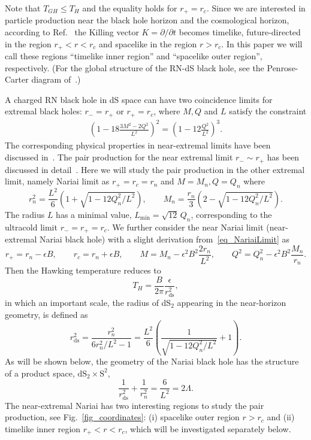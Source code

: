 \documentclass[aps,nofootinbib,superscriptaddress
]{revtex4}
\begin{document}
Note that $T_{GH} \leq T_H$ and the equality holds for $r_+ = r_c$. Since we are interested in particle production near the black hole horizon and the cosmological horizon, according to Ref.~\cite{Gibbons:1977mu} the Killing vector $K = \partial/\partial t$ becomes timelike, future-directed in the region $r_+ < r < r_c$ and spacelike in the region $r > r_c$. In this paper we will call these regions ``timelike inner region'' and ``spacelike outer region'', respectively. (For the global structure of the RN-dS black hole, see the Penrose-Carter diagram of~\cite{Gibbons:1977mu}.)


A charged RN black hole in dS space can have two coincidence limits for extremal black holes: $r_- = r_+$ or $r_+ = r_c$, where $M, Q$ and $L$ satisfy the constraint
\begin{eqnarray}
\left( 1 - 18 \frac{3 M^2 - 2 Q^2}{L^2} \right)^2 = \left( 1 - 12 \frac{Q^2}{L^2} \right)^3.
\end{eqnarray}
The corresponding physical properties in near-extremal limits have been discussed in~\cite{Castro:2022cuo}.
The pair production for the near extremal limit $r_- \sim r_+$ has been discussed in detail~\cite{Chen:2020mqs}. Here we will study the pair production in the other extremal limit, namely Nariai limit as $r_+ = r_c = r_n$ and $M = M_n, Q = Q_n$ where
\begin{equation} \label{eq_NariaiLimit}
r_n^2 = \frac{L^2}6 \left( 1 + \sqrt{1 - 12 Q_n^2/L^2} \right), \qquad M_n = \frac{r_n}3 \left( 2 - \sqrt{1 - 12 Q_n^2/L^2} \right).
\end{equation}
The radius $L$ has a minimal value, $L_\mathrm{min} = \sqrt{12} \, Q_n$, corresponding to the ultracold limit $r_- = r_+ = r_c$. We further consider the near Nariai limit (near-extremal Nariai black hole) with a slight derivation from~\eqref{eq_NariaiLimit} as
\begin{equation}
r_+ = r_n - \epsilon B, \qquad r_c = r_n + \epsilon B, \qquad M = M_n - \epsilon^2 B^2 \frac{2 r_n}{L^2}, \qquad Q^2 = Q_n^2 - \epsilon^2 B^2 \frac{M_n}{r_n}.
\end{equation}
Then the Hawking temperature reduces to
\begin{equation}
T_H = \frac{B}{2 \pi} \frac{\epsilon}{r_\mathrm{ds}^2},
\end{equation}
in which an important scale, the radius of dS$_2$ appearing in the near-horizon geometry, is defined as
\begin{equation} \label{eq_rds}
r_\mathrm{ds}^2 = \frac{r_n^2}{6 r_n^2/L^2 - 1} = \frac{L^2}{6} \left( \frac{1}{\sqrt{1 - 12 Q_n^2/L^2}} + 1 \right).
\end{equation}
As will be shown below, the geometry of the Nariai black hole has the structure of a product space, $\mathrm{dS}_2 \times \mathrm{S}^2$,~\cite{Ortaggio:2002bp}
\begin{equation}
\frac{1}{r_\mathrm{ds}^2} + \frac{1}{r_n^2} = \frac{6}{L^2} = 2 \Lambda.
\end{equation}
The near-extremal Nariai has two interesting regions to study the pair production, see Fig.~\ref{fig_coordinates}: (i) spacelike outer region $r > r_c$ and (ii) timelike inner region $r_+ < r < r_c$, which will be investigated separately below.
\end{document}
